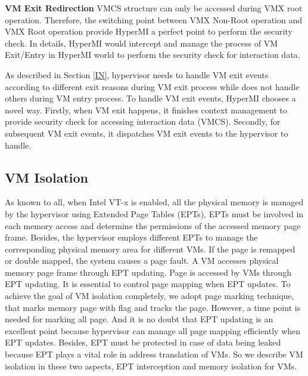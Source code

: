 \documentclass[conference]{IEEEtran}
\begin{document}
\textbf{VM Exit Redirection}
VMCS structure can only be accessed during VMX root operation. Therefore, the switching point between VMX Non-Root operation and VMX Root operation provide HyperMI a perfect point to perform the security check. In details, HyperMI would intercept and manage the process of VM Exit/Entry in HyperMI world to perform the security check for interaction data. 

As described in Section \ref{IN}, hypervisor needs to handle VM exit events according to different exit reasons during VM exit process while does not handle others during VM entry process. 
To handle VM exit events, HyperMI chooses a novel way.
Firstly, when VM exit happens, it finishes context management to provide security check for accessing interaction data (VMCS). Secondly, for subsequent VM exit events, it dispatches VM exit events to the hypervisor to handle. 



\subsection{VM Isolation}\label{VMISolation}


As known to all, when Intel VT-x is enabled, all the physical memory is managed by the hypervisor using Extended Page Tables (EPTs), EPTs must be involved in each memory access and determine the permissions of the accessed memory page frame. Besides, the hypervisor employs different EPTs to manage the corresponding physical memory area for different VMs. If the page is remapped or double mapped, the system causes a page fault. A VM accesses physical memory page frame through EPT updating. 
Page is accessed by VMs through EPT updating.
It is essential to control page mapping when EPT updates. To achieve the goal of VM isolation completely, we adopt page marking technique, that marks memory page with flag and tracks the page. However, a time point is needed for marking all page. And it is no doubt that EPT updating is an excellent point because hypervisor can manage all page mapping efficiently when EPT updates. Besides, EPT must be protected in case of data being leaked because EPT plays a vital role in address translation of VMs. So we describe VM isolation in these two aspects, EPT interception and memory isolation for VMs.
\end{document}
